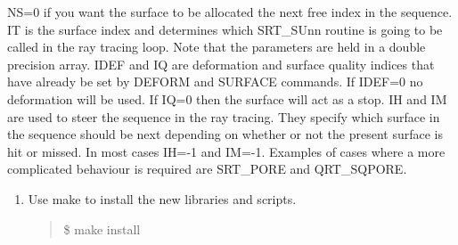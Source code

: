 \documentclass[letterpaper,10pt,english]{sphinxmanual}
\begin{document}
NS=0 if you want the surface to be allocated the next free
index in the sequence. IT is the surface index and determines
which SRT\_SUnn routine is going to be called in the ray tracing loop.
Note that the parameters are held in a double precision array.
IDEF and IQ are deformation and surface quality indices that
have already be set by DEFORM and SURFACE commands. If IDEF=0
no deformation will be used. If IQ=0 then the surface will act as a stop.
IH and IM are used
to steer the sequence in the ray tracing. They specify which
surface in the sequence should be next depending on whether or
not the present surface is hit or missed. In most cases IH=-1 and
IM=-1. Examples of cases where a more complicated behaviour is
required are SRT\_PORE and QRT\_SQPORE.
\begin{enumerate}
\def\theenumi{\arabic{enumi}}
\def\labelenumi{\theenumi .}
\makeatletter\def\p@enumii{\p@enumi \theenumi .}\makeatother
\setcounter{enumi}{5}
\item {} 
Use make to install the new libraries and scripts.
\begin{quote}

\$ make install
\end{quote}

\end{enumerate}


\renewcommand{\indexname}{Python Module Index}
\begin{sphinxtheindex}
\let\bigletter\sphinxstyleindexlettergroup
\bigletter{a}
\item\relax{}
\indexspace
\bigletter{i}
\item\relax{}
\indexspace
\bigletter{q}
\item\relax{}
\indexspace
\bigletter{x}
\item\relax{}
\item\relax{}
\end{sphinxtheindex}

\renewcommand{\indexname}{Index}
\printindex
\end{document}

